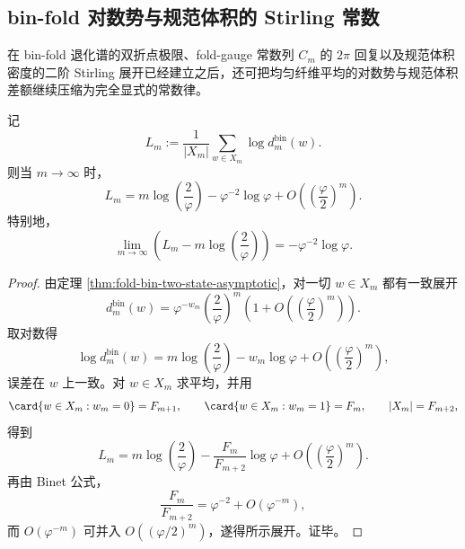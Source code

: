 \subsection{bin-fold 对数势与规范体积的 Stirling 常数}

在 bin-fold 退化谱的双折点极限、fold-gauge 常数列 \(C_m\) 的 \(2\pi\) 回复以及规范体积密度的二阶 Stirling 展开已经建立之后，还可把均匀纤维平均的对数势与规范体积差额继续压缩为完全显式的常数律。

\begin{theorem}\label{thm:derived-binfold-average-log-potential-constant}
记
\[
L_m:=\frac{1}{|X_m|}\sum_{w\in X_m}\log d_m^{\mathrm{bin}}(w).
\]
则当 \(m\to\infty\) 时，
\[
L_m
=
m\log\!\left(\frac{2}{\varphi}\right)
-\varphi^{-2}\log\varphi
+O\!\left(\left(\frac{\varphi}{2}\right)^m\right).
\]
特别地，
\[
\lim_{m\to\infty}\left(
L_m-m\log\!\left(\frac{2}{\varphi}\right)
\right)
=
-\varphi^{-2}\log\varphi.
\]
\end{theorem}
\begin{proof}
由定理 \ref{thm:fold-bin-two-state-asymptotic}，对一切 \(w\in X_m\) 都有一致展开
\[
d_m^{\mathrm{bin}}(w)
=
\varphi^{-w_m}\left(\frac{2}{\varphi}\right)^m
\left(1+O\!\left(\left(\frac{\varphi}{2}\right)^m\right)\right).
\]
取对数得
\[
\log d_m^{\mathrm{bin}}(w)
=
m\log\!\left(\frac{2}{\varphi}\right)-w_m\log\varphi
+O\!\left(\left(\frac{\varphi}{2}\right)^m\right),
\]
误差在 \(w\) 上一致。对 \(w\in X_m\) 求平均，并用
\[
\card\{w\in X_m:w_m=0\}=F_{m+1},
\qquad
\card\{w\in X_m:w_m=1\}=F_m,
\qquad
|X_m|=F_{m+2},
\]
得到
\[
L_m
=
m\log\!\left(\frac{2}{\varphi}\right)
-\frac{F_m}{F_{m+2}}\log\varphi
+O\!\left(\left(\frac{\varphi}{2}\right)^m\right).
\]
再由 Binet 公式，
\[
\frac{F_m}{F_{m+2}}=\varphi^{-2}+O(\varphi^{-m}),
\]
而 \(O(\varphi^{-m})\) 可并入 \(O((\varphi/2)^m)\)，遂得所示展开。证毕。
\end{proof}

